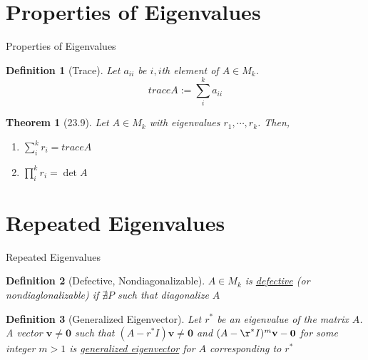 \documentclass[final]{beamer}
\newtheorem{defn}{Definition}
\newtheorem{thm}{Theorem}
\newcommand{\bd}{\mathbf}
\begin{document}
\section{Properties of Eigenvalues} %
\label{sec:properties_of_eigenvalues}
\begin{frame}[t]{Properties of Eigenvalues}
	\begin{defn}
		[Trace] Let $a_{ii}$ be $i,i$th element of $A\in M_k$. \[
			trace A := \sum_i^k a_{ii}
		\]
	\end{defn}
	\begin{thm}
		[23.9] Let $A\in M_k$ with eigenvalues $r_1,\cdots,r_k$. Then, 
		\begin{enumerate}
			\item $\sum_i^k r_i = trace A$
			\item $\prod_i^k r_i = \det A$
		\end{enumerate}
	\end{thm}
\end{frame}

\section{Repeated Eigenvalues} %
\label{sec:repeated_eigenvalues}
\begin{frame}[t]{Repeated Eigenvalues}
	\begin{defn}
		[Defective, Nondiagonalizable]
		$A\in M_k$ is \uline{defective} (or nondiaglonalizable) if $\nexists P$ such that diagonalize $A$
	\end{defn}
	\begin{defn}
		[Generalized Eigenvector] Let $r^\ast$ be an eigenvalue of the matrix $A$. A vector $\bd{v}\neq\bd{0}$ such that $(A-r^\ast I)\bd{v}\neq\bd{0}$ and $(A-\r^\ast I)^m\bd{v}-\bd{0}$ for some integer $m>1$ is \uline{generalized eigenvector} for $A$ corresponding to $r^\ast$
	\end{defn}

\end{frame}
\end{document}
